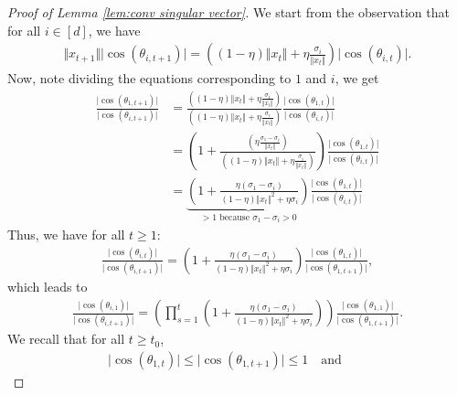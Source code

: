 \begin{proof}[Proof of Lemma \ref{lem:conv singular vector}]
     We start from the observation that for all $i \in [d]$, we have 
    \begin{align}\label{eq: key equation}
        \Vert x_{t+1} \Vert  \vert \cos(\theta_{i, t+1}) \vert = \left( (1-\eta) \Vert x_t \Vert + \eta \frac{\sigma_i}{\Vert x_t \Vert }\right) \vert \cos(\theta_{i, t}) \vert.
    \end{align}
     Now, note dividing the equations corresponding to $1$ and $i$, we get 
    \begin{align}\label{eq: key equation}
     \frac{\vert \cos(\theta_{1, t+1}) \vert}{\vert \cos(\theta_{i, t+1}) \vert} & = \frac{\left( (1-\eta) \Vert x_t \Vert + \eta \frac{\sigma_1}{\Vert x_t \Vert }\right)}{\left( (1-\eta) \Vert x_t \Vert + \eta \frac{\sigma_i}{\Vert x_t \Vert }\right)} \frac{\vert \cos(\theta_{1, t}) \vert}{\vert \cos(\theta_{i, t}) \vert} \\ 
     & = \left(1+ \frac{\left( \eta \frac{\sigma_1 - \sigma_i}{\Vert x_t \Vert }\right)}{\left( (1-\eta) \Vert x_t \Vert + \eta \frac{\sigma_i}{\Vert x_t \Vert }\right)}  \right)\frac{\vert \cos(\theta_{1, t}) \vert}{\vert \cos(\theta_{i, t}) \vert} \\
     & = \underbrace{\left(1 + \frac{ \eta (\sigma_1 - \sigma_i) }{ (1-\eta) \Vert x_t \Vert^2 + \eta \sigma_i}  \right)}_{ > 1 \text{ because } \sigma_1 - \sigma_i > 0}\frac{\vert \cos(\theta_{1, t}) \vert}{\vert \cos(\theta_{i, t}) \vert}
    \end{align}
    Thus, we have for all $t\ge 1:$
    \begin{align*}
         \frac{\vert \cos(\theta_{i, t}) \vert}{\vert \cos(\theta_{i, t+1}) \vert} = \left(1 + \frac{ \eta (\sigma_1 - \sigma_i) }{ (1-\eta) \Vert x_t \Vert^2 + \eta \sigma_i}  \right)\frac{\vert \cos(\theta_{1, t}) \vert}{\vert \cos(\theta_{1, t+1}) \vert},
    \end{align*}
    which leads to 
     \begin{align*}
        \frac{\vert \cos(\theta_{i, 1}) \vert}{\vert \cos(\theta_{i, t+1}) \vert} = \left(\prod_{s = 1}^t \left(1 + \frac{ \eta (\sigma_1 - \sigma_i) }{ (1-\eta) \Vert x_t \Vert^2 + \eta \sigma_i}  \right) \right)\frac{\vert \cos(\theta_{1, 1}) \vert}{\vert \cos(\theta_{1, t+1}) \vert}.
    \end{align*}
     We recall that for all $t \ge t_0$,
    \begin{align*}
         \vert \cos(\theta_{1, t}) \vert \le \vert \cos(\theta_{1, t+1}) \vert \le 1  \quad \text{and} \qquad 

\end{align*}
\end{proof}
